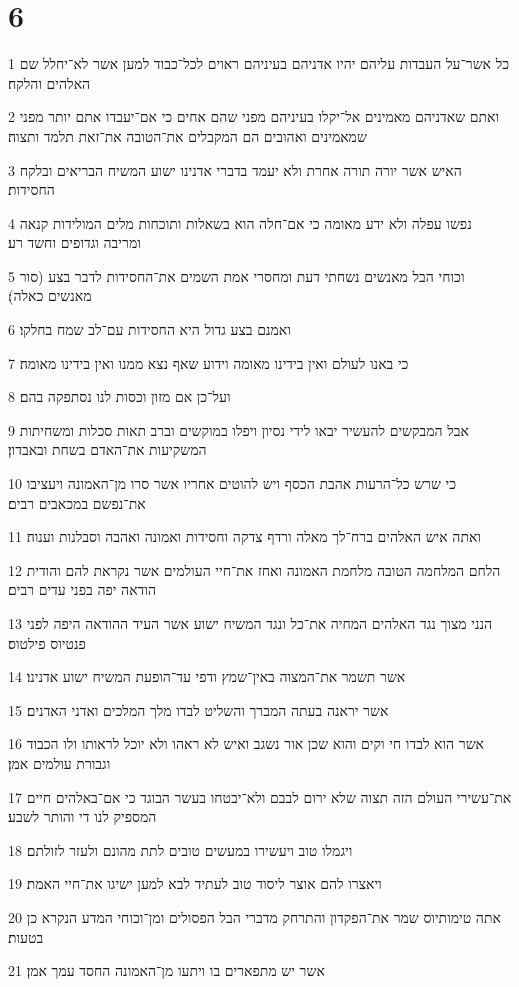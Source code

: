 \chapter{6}

\par 1 כל אשר־על העבדות עליהם יהיו אדניהם בעיניהם ראוים לכל־כבוד למען אשר לא־יחלל שם האלהים והלקח׃
\par 2 ואתם שאדניהם מאמינים אל־יקלו בעיניהם מפני שהם אחים כי אם־יעבדו אתם יותר מפני שמאמינים ואהובים הם המקבלים את־הטובה את־זאת תלמד ותצוה׃
\par 3 האיש אשר יורה תורה אחרת ולא יעמד בדברי אדנינו ישוע המשיח הבריאים ובלקח החסידות׃
\par 4 נפשו עפלה ולא ידע מאומה כי אם־חלה הוא בשאלות ותוכחות מלים המולידות קנאה ומריבה וגדופים וחשד רע׃
\par 5 וכוחי הבל מאנשים נשחתי דעת ומחסרי אמת השמים את־החסידות לדבר בצע (סור מאנשים כאלה)׃
\par 6 ואמנם בצע גדול היא החסידות עם־לב שמח בחלקו׃
\par 7 כי באנו לעולם ואין בידינו מאומה וידוע שאף נצא ממנו ואין בידינו מאומה׃
\par 8 ועל־כן אם מזון וכסות לנו נסתפקה בהם׃
\par 9 אבל המבקשים להעשיר יבאו לידי נסיון ויפלו במוקשים וברב תאות סכלות ומשחיתות המשקיעות את־האדם בשחת ובאבדון׃
\par 10 כי שרש כל־הרעות אהבת הכסף ויש להוטים אחריו אשר סרו מן־האמונה ויעציבו את־נפשם במכאבים רבים׃
\par 11 ואתה איש האלהים ברח־לך מאלה ורדף צדקה וחסידות ואמונה ואהבה וסבלנות וענוה׃
\par 12 הלחם המלחמה הטובה מלחמת האמונה ואחז את־חיי העולמים אשר נקראת להם והודית הודאה יפה בפני עדים רבים׃
\par 13 הנני מצוך נגד האלהים המחיה את־כל ונגד המשיח ישוע אשר העיד ההודאה היפה לפני פנטיוס פילטוס׃
\par 14 אשר תשמר את־המצוה באין־שמץ ודפי עד־הופעת המשיח ישוע אדנינו׃
\par 15 אשר יראנה בעתה המברך והשליט לבדו מלך המלכים ואדני האדנים׃
\par 16 אשר הוא לבדו חי וקים והוא שכן אור נשגב ואיש לא ראהו ולא יוכל לראותו ולו הכבוד וגבורת עולמים אמן׃
\par 17 את־עשירי העולם הזה תצוה שלא ירום לבבם ולא־יבטחו בעשר הבוגד כי אם־באלהים חיים המספיק לנו די והותר לשבע׃
\par 18 ויגמלו טוב ויעשירו במעשים טובים לתת מהונם ולעזר לזולתם׃
\par 19 ויאצרו להם אוצר ליסוד טוב לעתיד לבא למען ישיגו את־חיי האמת׃
\par 20 אתה טימותיוס שמר את־הפקדון והתרחק מדברי הבל הפסולים ומן־וכוחי המדע הנקרא כן בטעות׃
\par 21 אשר יש מתפארים בו ויתעו מן־האמונה החסד עמך אמן׃


